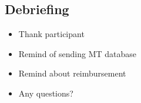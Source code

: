 \subsection{Debriefing}
\begin{itemize}
\item Thank participant
\item Remind of sending MT database
\item Remind about reimbursement
\item Any questions?
\end{itemize}
